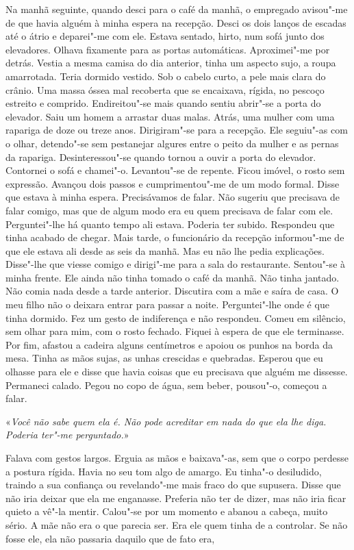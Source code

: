 Na manhã seguinte, quando desci para o café da manhã, o empregado
avisou"-me de que havia alguém à minha espera na recepção. Desci os dois
lanços de escadas até o átrio e deparei"-me com ele. Estava sentado,
hirto, num sofá junto dos elevadores. Olhava fixamente para as portas
automáticas. Aproximei"-me por detrás. Vestia a mesma camisa do dia
anterior, tinha um aspecto sujo, a roupa amarrotada. Teria dormido
vestido. Sob o cabelo curto, a pele mais clara do crânio. Uma massa
óssea mal recoberta que se encaixava, rígida, no pescoço estreito e
comprido. Endireitou"-se mais quando sentiu abrir"-se a porta do
elevador. Saiu um homem a arrastar duas malas. Atrás, uma mulher com uma
rapariga de doze ou treze anos. Dirigiram"-se para a recepção. Ele
seguiu"-as com o olhar, detendo"-se sem pestanejar algures entre o peito
da mulher e as pernas da rapariga. Desinteressou"-se quando tornou a
ouvir a porta do elevador. Contornei o sofá e chamei"-o. Levantou"-se de
repente. Ficou imóvel, o rosto sem expressão. Avançou dois passos e
cumprimentou"-me de um modo formal. Disse que estava à minha espera.
Precisávamos de falar. Não sugeriu que precisava de falar comigo, mas
que de algum modo era eu quem precisava de falar com ele. Perguntei"-lhe
há quanto tempo ali estava. Poderia ter subido. Respondeu que tinha
acabado de chegar. Mais tarde, o funcionário da recepção informou"-me de
que ele estava ali desde as seis da manhã. Mas eu não lhe pedia
explicações. Disse"-lhe que viesse comigo e dirigi"-me para a sala do
restaurante. Sentou"-se à minha frente. Ele ainda não tinha tomado o
café da manhã. Não tinha jantado. Não comia nada desde a tarde
anterior. Discutira com a mãe e saíra de casa. O meu filho não o deixara
entrar para passar a noite. Perguntei"-lhe onde é que tinha dormido. Fez
um gesto de indiferença e não respondeu. Comeu em silêncio, sem olhar
para mim, com o rosto fechado. Fiquei à espera de que ele terminasse.
Por fim, afastou a cadeira alguns centímetros e apoiou os punhos na
borda da mesa. Tinha as mãos sujas, as unhas crescidas e quebradas.
Esperou que eu olhasse para ele e disse que havia coisas que eu
precisava que alguém me dissesse. Permaneci calado. Pegou no copo de
água, sem beber, pousou"-o, começou a falar.

«\emph{Você não sabe quem ela é. Não pode acreditar em nada do que ela
lhe diga. Poderia ter"-me perguntado.}»

Falava com gestos largos. Erguia as mãos e baixava"-as, sem que o corpo
perdesse a postura rígida. Havia no seu tom algo de amargo. Eu tinha"-o
desiludido, traindo a sua confiança ou revelando"-me mais fraco do que
supusera. Disse que não iria deixar que ela me enganasse. Preferia não
ter de dizer, mas não iria ficar quieto a vê"-la mentir. Calou"-se
por um momento e abanou a cabeça, muito sério. A mãe não era o que
parecia ser. Era ele quem tinha de a controlar. Se não fosse ele, ela
não passaria daquilo que de fato era,

